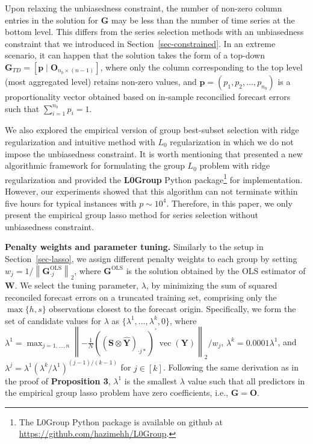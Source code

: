 \documentclass[11pt,a4paper,]{article}
\begin{document}
Upon relaxing the unbiasedness constraint, the number of non-zero column
entries in the solution for \(\boldsymbol{G}\) may be less than the
number of time series at the bottom level. This differs from the series
selection methods with an unbiasedness constraint that we introduced in
Section~\ref{sec-constrained}. In an extreme scenario, it can happen
that the solution takes the form of a top-down
\(\boldsymbol{G}_{TD}=[\boldsymbol{p} \mid \boldsymbol{O}_{n_b \times (n-1)}]\),
where only the column corresponding to the top level (most aggregated
level) retains non-zero values, and
\(\boldsymbol{p} = (p_1, p_2, \ldots, p_{n_b})\) is a proportionality
vector obtained based on in-sample reconcilied forecast errors such that
\(\sum_{i=1}^{n_b} p_i=1\).

We also explored the empirical version of group best-subset selection
with ridge regularization and intuitive method with \(L_0\)
regularization in which we do not impose the unbiasedness constraint. It
is worth mentioning that \textcite{Hazimeh2023-ie} presented a new
algorithmic framework for formulating the group \(L_0\) problem with
ridge regularization and provided the \textbf{L0Group} Python
package\footnote{The L0Group Python package is available on github at
  \url{https://github.com/hazimehh/L0Group}.} for implementation.
However, our experiments showed that this algorithm can not terminate
within five hours for typical instances with \(p \sim 10^4\). Therefore,
in this paper, we only present the empirical group lasso method for
series selection without unbiasedness constraint.

\textbf{Penalty weights and parameter tuning.} Similarly to the setup in
Section~\ref{sec-lasso}, we assign different penalty weights to each
group by setting
\(w_j = 1/\left\|\boldsymbol{G}_{\cdot j}^{\text{OLS}}\right\|_2\),
where \(\boldsymbol{G}^{\text{OLS}}\) is the solution obtained by the
OLS estimator of \(\boldsymbol{W}\). We select the tuning parameter,
\(\lambda\), by minimizing the sum of squared reconciled forecast errors
on a truncated training set, comprising only the \(\max\{h, s\}\)
observations closest to the forecast origin. Specifically, we form the
set of candidate values for \(\lambda\) as
\(\{\lambda^{1},...,\lambda^{k}, 0\}\), where
\(\lambda^{1} = \max _{j=1, \ldots, n}\left\|-\frac{1}{N}\left(\left(\boldsymbol{S} \otimes \hat{\boldsymbol{Y}}\right)_{\cdot j*}\right)^{\prime} \operatorname{vec}(\boldsymbol{Y})\right\|_2 / w_j\),
\(\lambda^{k} = 0.0001\lambda^{1}\), and
\(\lambda^{j} = \lambda^{1}\left(\lambda^{k} / \lambda^{1}\right)^{(j-1) / (k-1)}\)
for \(j \in [k]\). Following the same derivation as in the proof of
\textbf{Proposition 3}, \(\lambda^{1}\) is the smallest \(\lambda\)
value such that all predictors in the empirical group lasso problem have
zero coefficients, i.e., \(\boldsymbol{G} = \boldsymbol{O}\).
\end{document}
